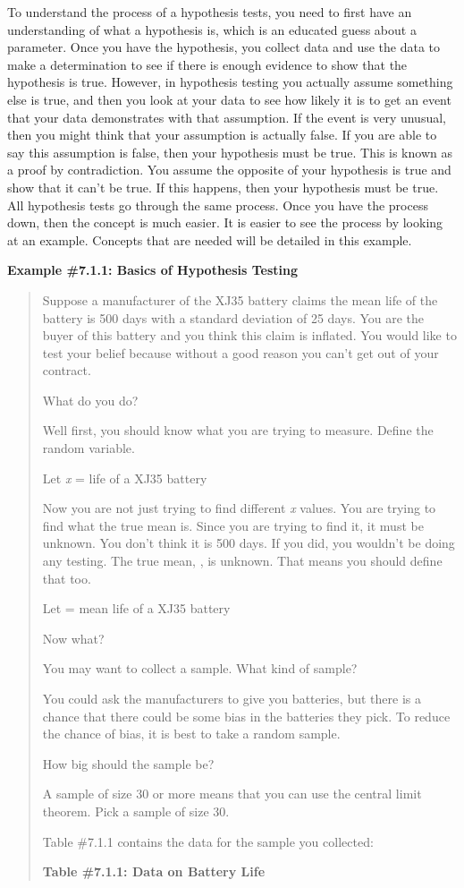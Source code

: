 \documentclass[]{book}
\begin{document}
To understand the process of a hypothesis tests, you need to first have an understanding of what a hypothesis is, which is an educated guess about a parameter. Once you have the hypothesis, you collect data and use the data to make a determination to see if there is enough evidence to show that the hypothesis is true. However, in hypothesis testing you actually assume something else is true, and then you look at your data to see how likely it is to get an event that your data demonstrates with that assumption. If the event is very unusual, then you might think that your assumption is actually false. If you are able to say this assumption is false, then your hypothesis must be true. This is known as a proof by contradiction. You assume the opposite of your hypothesis is true and show that it can't be true. If this happens, then your hypothesis must be true. All hypothesis tests go through the same process. Once you have the process down, then the concept is much easier. It is easier to see the process by looking at an example. Concepts that are needed will be detailed in this example.

\textbf{Example \#7.1.1: Basics of Hypothesis Testing}

\begin{quote}
Suppose a manufacturer of the XJ35 battery claims the mean life of the battery is 500 days with a standard deviation of 25 days. You are the buyer of this battery and you think this claim is inflated. You would like to test your belief because without a good reason you can't get out of your contract.

What do you do?

Well first, you should know what you are trying to measure. Define the random variable.

Let \emph{x} = life of a XJ35 battery

Now you are not just trying to find different \emph{x} values. You are trying to find what the true mean is. Since you are trying to find it, it must be unknown. You don't think it is 500 days. If you did, you wouldn't be doing any testing. The true mean, , is unknown. That means you should define that too.

Let = mean life of a XJ35 battery

Now what?

You may want to collect a sample. What kind of sample?

You could ask the manufacturers to give you batteries, but there is a chance that there could be some bias in the batteries they pick. To reduce the chance of bias, it is best to take a random sample.

How big should the sample be?

A sample of size 30 or more means that you can use the central limit theorem. Pick a sample of size 30.

Table \#7.1.1 contains the data for the sample you collected:

\textbf{Table \#7.1.1: Data on Battery Life}
\end{quote}
\end{document}
